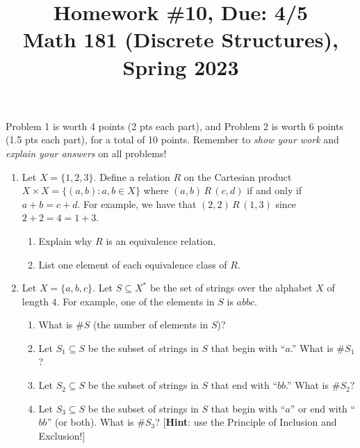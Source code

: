 \documentclass[11pt]{article}
\title{Homework \#10, Due: 4/5 \\Math 181 (Discrete Structures), Spring 2023}
\date{}
\begin{document}
\maketitle

\thispagestyle{empty}

\vspace{-1cm}

Problem 1 is worth 4 points (2 pts each part), and Problem 2 is worth 6 points (1.5 pts each part), for a total of 10 points. Remember to \emph{show your work} and \emph{explain your answers} on all problems!

\begin{enumerate}

\item Let $X= \{1,2,3\}$. Define a relation $R$ on the Cartesian product $X \times X = \{(a,b)\colon a, b\in X\}$ where $(a,b) \, R \, (c,d)$ if and only if $a+b = c+d$. For example, we have that $(2,2) \, R \, (1,3)$ since $2+2=4=1+3$.
\begin{enumerate}
\item Explain why $R$ is an equivalence relation.
\item List one element of each equivalence class of $R$.
\end{enumerate}

\item Let $X = \{a,b,c\}$. Let $S\subseteq X^{*}$ be the set of strings over the alphabet $X$ of length $4$. For example, one of the elements in $S$ is $abbc$.
\begin{enumerate}
\item What is $\#S $ (the number of elements in $S$)?
\item Let $S_1 \subseteq S$ be the subset of strings in $S$ that begin with ``$a$.'' What is $\#S_1$?
\item Let $S_2 \subseteq S$ be the subset of strings in $S$ that end with ``$bb$.'' What is $\#S_2$?
\item Let $S_3 \subseteq S$ be the subset of strings in $S$ that begin with ``$a$'' or end with ``$bb$'' (or both). What is $\#S_3$? [{\bf Hint}: use the Principle of Inclusion and Exclusion!]
\end{enumerate}

\end{enumerate}
\end{document}
